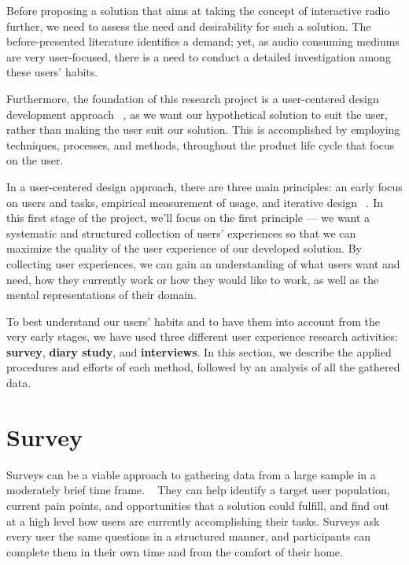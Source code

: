 \cleardoublepage
\label{chap:userresearch}

Before proposing a solution that aims at taking the concept of interactive radio further, we need to assess the need and desirability for such a solution. The before-presented literature identifies a demand; yet, as audio consuming mediums are very user-focused, there is a need to conduct a detailed investigation among these users' habits.

Furthermore, the foundation of this research project is a user-centered design development approach ~\cite{McLoone2010}, as we want our hypothetical solution to suit the user, rather than making the user suit our solution. This is accomplished by employing techniques, processes, and methods, throughout the product life cycle that focus on the user. ~\cite{Courage2005} 

In a user-centered design approach, there are three main principles: an early focus on users and tasks, empirical measurement of usage, and iterative design ~\cite{Courage2005}. In this first stage of the project, we'll focus on the first principle — we want a systematic and structured collection of users’ experiences so that we can maximize the quality of the user experience of our developed solution. By collecting user experiences, we can gain an understanding of what users want and need, how they currently work or how they would like to work, as well as the mental representations of their domain.

To best understand our users' habits and to have them into account from the very early stages, we have used three different user experience research activities: \textbf{survey}, \textbf{diary study}, and \textbf{interviews}. In this section, we describe the applied procedures and efforts of each method, followed by an analysis of all the gathered data.


\section{Survey}
Surveys can be a viable approach to gathering data from a large sample in a moderately brief time frame. ~\cite{Courage2005} They can help identify a target user population, current pain points, and opportunities that a solution could fulfill, and find out at a high level how users are currently accomplishing their tasks. Surveys ask every user the same questions in a structured manner, and participants can complete them in their own time and from the comfort of their home.

